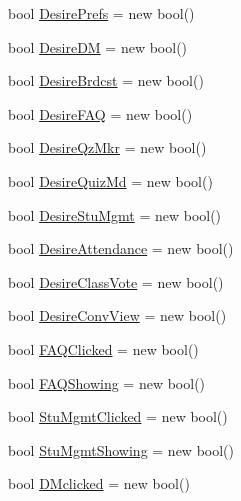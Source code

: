 \begin{DoxyCompactItemize}
bool \hyperlink{class_sr_p___classroom_inq_1_1frm_classrrom_inq_a263bbbace2f9c25e5f92573e5f4845ba}{\-Desire\-Prefs} = new bool()
\item 
bool \hyperlink{class_sr_p___classroom_inq_1_1frm_classrrom_inq_a8f8f9bb905b290fa448b445560458f89}{\-Desire\-D\-M} = new bool()
\item 
bool \hyperlink{class_sr_p___classroom_inq_1_1frm_classrrom_inq_ab67298a2e18c70080e8cc5e604223679}{\-Desire\-Brdcst} = new bool()
\item 
bool \hyperlink{class_sr_p___classroom_inq_1_1frm_classrrom_inq_ac893a3454dc239c417d6a1e67882d0cb}{\-Desire\-F\-A\-Q} = new bool()
\item 
bool \hyperlink{class_sr_p___classroom_inq_1_1frm_classrrom_inq_a6be0280a203b7fa9cfda5d8d1703d81a}{\-Desire\-Qz\-Mkr} = new bool()
\item 
bool \hyperlink{class_sr_p___classroom_inq_1_1frm_classrrom_inq_afe88ba4ba5644eaceb0edd49fa307c61}{\-Desire\-Quiz\-Md} = new bool()
\item 
bool \hyperlink{class_sr_p___classroom_inq_1_1frm_classrrom_inq_acc0266ba1df8a99c08f9f4ad95c01252}{\-Desire\-Stu\-Mgmt} = new bool()
\item 
bool \hyperlink{class_sr_p___classroom_inq_1_1frm_classrrom_inq_a2f4a98083518f487399985a1b76d44b5}{\-Desire\-Attendance} = new bool()
\item 
bool \hyperlink{class_sr_p___classroom_inq_1_1frm_classrrom_inq_af51d439b56b35a3b7d8fdaa6bb5252cd}{\-Desire\-Class\-Vote} = new bool()
\item 
bool \hyperlink{class_sr_p___classroom_inq_1_1frm_classrrom_inq_a3bd81e817c525b0cf0f1a0ae53e527d3}{\-Desire\-Conv\-View} = new bool()
\item 
bool \hyperlink{class_sr_p___classroom_inq_1_1frm_classrrom_inq_a2b3fd84c890215dd61c54946b49906d2}{\-F\-A\-Q\-Clicked} = new bool()
\item 
bool \hyperlink{class_sr_p___classroom_inq_1_1frm_classrrom_inq_a37a892198dda5bfa752c66df2debb199}{\-F\-A\-Q\-Showing} = new bool()
\item 
bool \hyperlink{class_sr_p___classroom_inq_1_1frm_classrrom_inq_ad0a57ebb96913cfbb9622d8c4c7b52cb}{\-Stu\-Mgmt\-Clicked} = new bool()
\item 
bool \hyperlink{class_sr_p___classroom_inq_1_1frm_classrrom_inq_a6a40312dc72ead57d8d40d415ee14a07}{\-Stu\-Mgmt\-Showing} = new bool()
\item 
bool \hyperlink{class_sr_p___classroom_inq_1_1frm_classrrom_inq_a663c3385393ae39a41bd647632ba4617}{\-D\-Mclicked} = new bool()

\end{DoxyCompactItemize}
